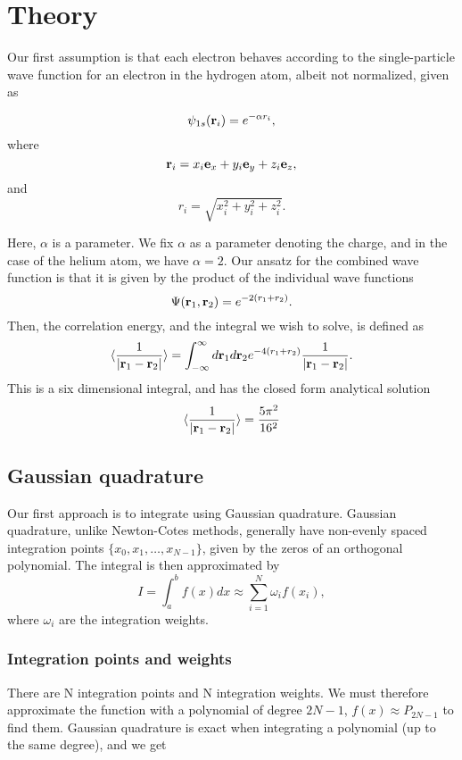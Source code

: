 \documentclass{emulateapj}
\begin{document}
\section{Theory}
\label{sec:method}
Our first assumption is that each electron behaves according to the single-particle wave function for an electron in the hydrogen atom, albeit not normalized, given as

\[
   \psi_{1s}({\bf r}_i)  =   e^{-\alpha r_i},
\]
where
\[
   {\bf r}_i =  x_i {\bf e}_x + y_i {\bf e}_y +z_i {\bf e}_z ,
\]
and
\[
r_i = \sqrt{x_i^2+y_i^2+z_i^2}.
\]

Here, $\alpha$ is a parameter. We fix $\alpha$ as a parameter denoting the charge, and in the case of the helium atom, we have $\alpha = 2$. Our ansatz for the combined wave function is that it is given by the product of the individual wave functions
\[
   \Psi({\bf r}_1,{\bf r}_2)  =   e^{-2 (r_1+r_2)}.
\]
Then, the correlation energy, and the integral we wish to solve, is defined as
\begin{equation}\label{eq:correlationenergy}
   \langle \frac{1}{|{\bf r}_1-{\bf r}_2|} \rangle =
   \int_{-\infty}^{\infty} d{\bf r}_1d{\bf r}_2  e^{-4 (r_1+r_2)}\frac{1}{|{\bf r}_1-{\bf r}_2|}.
\end{equation}
This is a six dimensional integral, and has the closed form analytical solution
\[
\langle \frac{1}{|{\bf r}_1-{\bf r}_2|} \rangle = \frac{5\pi^2}{16^2}
\]

\subsection{Gaussian quadrature}
Our first approach is to integrate using Gaussian quadrature. Gaussian quadrature, unlike Newton-Cotes methods, generally have non-evenly spaced integration points $\{x_0 , x_1 , \dots , x_{N-1}\}$, given by the zeros of an orthogonal polynomial. The integral is then approximated by
\begin{equation}
	I = \int_a^b f(x) dx \approx \sum^N_{i = 1} \omega_i f(x_i),
	\label{eq:quadrature}
\end{equation}
where $\omega_i$ are the integration weights.

\subsubsection{Integration points and weights}
There are N integration points and N integration weights. We must therefore approximate the function with a polynomial of degree $2N-1$, $f(x) \approx P_{2N-1}$ to find them. Gaussian quadrature is exact when integrating a polynomial (up to the same degree), and we get
\end{document}
